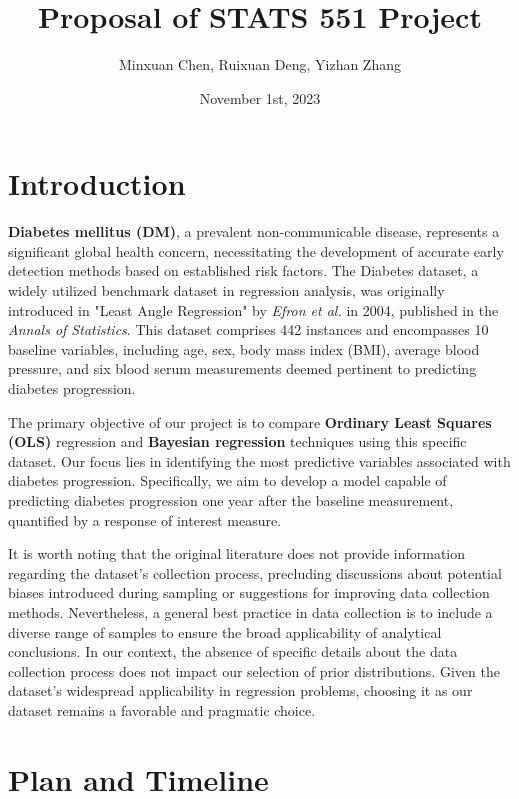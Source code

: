 \documentclass[12pt,a4paper]{article}
\title{Proposal of STATS 551 Project}
\author{Minxuan Chen, Ruixuan Deng, Yizhan Zhang}
\date{November 1st, 2023}
\begin{document}
\maketitle


\section{Introduction}\label{sec:intro}
\textbf{Diabetes mellitus (DM)}, a prevalent non-communicable disease, represents a significant global health concern, necessitating the development of accurate early detection methods based on established risk factors. The Diabetes dataset, a widely utilized benchmark dataset in regression analysis, was originally introduced in "Least Angle Regression" by \textit{Efron et al.} in 2004, published in the \textit{Annals of Statistics}. This dataset comprises 442 instances and encompasses 10 baseline variables, including age, sex, body mass index (BMI), average blood pressure, and six blood serum measurements deemed pertinent to predicting diabetes progression.

The primary objective of our project is to compare \textbf{Ordinary Least Squares (OLS)} regression and \textbf{Bayesian regression} techniques using this specific dataset. Our focus lies in identifying the most predictive variables associated with diabetes progression. Specifically, we aim to develop a model capable of predicting diabetes progression one year after the baseline measurement, quantified by a response of interest measure.

It is worth noting that the original literature does not provide information regarding the dataset's collection process, precluding discussions about potential biases introduced during sampling or suggestions for improving data collection methods. Nevertheless, a general best practice in data collection is to include a diverse range of samples to ensure the broad applicability of analytical conclusions. In our context, the absence of specific details about the data collection process does not impact our selection of prior distributions. Given the dataset's widespread applicability in regression problems, choosing it as our dataset remains a favorable and pragmatic choice.


\section{Plan and Timeline}\label{sec:methods}
\end{document}
